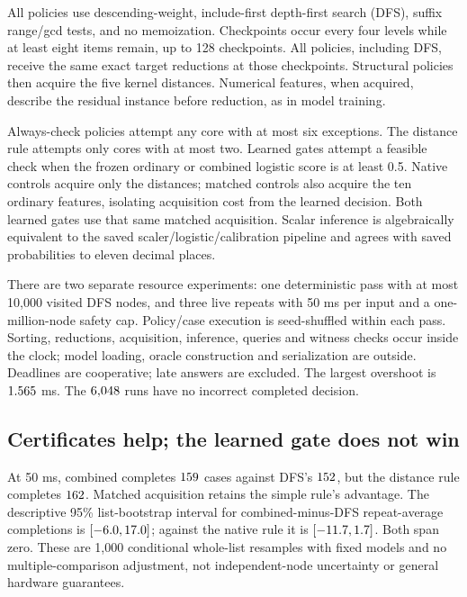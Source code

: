 \documentclass[10pt,english]{article}
\begin{document}
All policies use descending-weight, include-first depth-first search (DFS), suffix range/gcd tests, and no memoization. Checkpoints occur every four levels while at least eight items remain, up to 128 checkpoints. All policies, including DFS, receive the same exact target reductions at those checkpoints. Structural policies then acquire the five kernel distances. Numerical features, when acquired, describe the residual instance before reduction, as in model training.

Always-check policies attempt any core with at most six exceptions. The distance rule attempts only cores with at most two. Learned gates attempt a feasible check when the frozen ordinary or combined logistic score is at least 0.5. Native controls acquire only the distances; matched controls also acquire the ten ordinary features, isolating acquisition cost from the learned decision. Both learned gates use that same matched acquisition. Scalar inference is algebraically equivalent to the saved scaler/logistic/calibration pipeline and agrees with saved probabilities to eleven decimal places.

There are two separate resource experiments: one deterministic pass with at most 10,000 visited DFS nodes, and three live repeats with 50 ms per input and a one-million-node safety cap. Policy/case execution is seed-shuffled within each pass. Sorting, reductions, acquisition, inference, queries and witness checks occur inside the clock; model loading, oracle construction and serialization are outside. Deadlines are cooperative; late answers are excluded. The largest overshoot is \(1.565\) ms. The \(6{,}048\) runs have no incorrect completed decision.

\begin{table}[htbp]
\centering\small

\caption{Fresh branch-check comparison. Live is the median aggregate number completed at 50 ms per case over three repeats. Node cap is completions in the separate 10,000-node pass; Nodes and Seconds describe that pass, including acquisition and checking. The node allowance is not a uniform computational-work budget.}
\end{table}

\subsection{Certificates help; the learned gate does not win}
At 50 ms, combined completes \(159\) cases against DFS's \(152\), but the distance rule completes \(162\). Matched acquisition retains the simple rule's advantage. The descriptive 95\% list-bootstrap interval for combined-minus-DFS repeat-average completions is \([-6.0,17.0]\); against the native rule it is \([-11.7,1.7]\). Both span zero. These are 1,000 conditional whole-list resamples with fixed models and no multiple-comparison adjustment, not independent-node uncertainty or general hardware guarantees.
\end{document}
